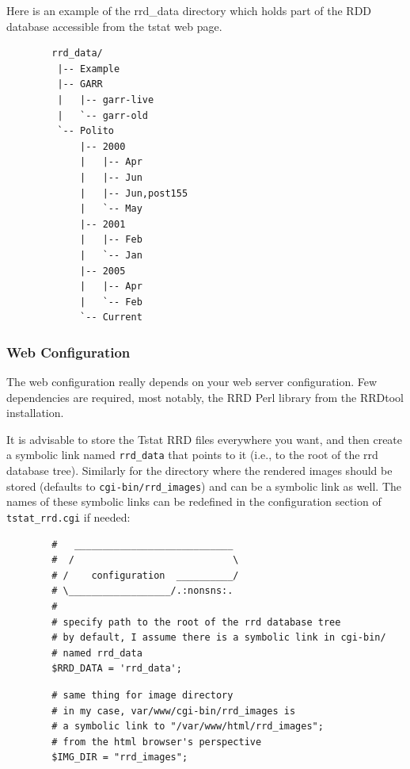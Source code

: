 \documentclass[11pt]{article}
\begin{document}
Here is an example of the rrd\_data directory which holds part of the RDD database
accessible from the tstat web page.

\begin{small}\begin{verbatim}
        rrd_data/
         |-- Example
         |-- GARR
         |   |-- garr-live
         |   `-- garr-old
         `-- Polito
             |-- 2000
             |   |-- Apr
             |   |-- Jun
             |   |-- Jun,post155
             |   `-- May
             |-- 2001
             |   |-- Feb
             |   `-- Jan
             |-- 2005
             |   |-- Apr
             |   `-- Feb
             `-- Current
\end{verbatim}\end{small} \noindent
\subsubsection{Web Configuration\label{Web_Configuration}}


The web configuration really depends on your web server configuration. Few
dependencies are required, most notably, the RRD Perl library from the RRDtool
installation.



It is advisable to store the Tstat RRD files
everywhere you want, and then create a symbolic link 
named \texttt{rrd\_data} that points to it (i.e., to the root of 
the rrd database tree). Similarly for the directory
where the rendered images should be stored (defaults to \texttt{cgi-bin/rrd\_images})
and can be a symbolic link as well.
The names of these symbolic links can be redefined in the 
configuration section of \texttt{tstat\_rrd.cgi} if needed:

\begin{small}\begin{verbatim}
        #   ____________________________
        #  /                            \
        # /    configuration  __________/
        # \__________________/.:nonsns:.
        #
        # specify path to the root of the rrd database tree
        # by default, I assume there is a symbolic link in cgi-bin/
        # named rrd_data
        $RRD_DATA = 'rrd_data';
\end{verbatim}\end{small} \noindent
\begin{small}\begin{verbatim}
        # same thing for image directory
        # in my case, var/www/cgi-bin/rrd_images is
        # a symbolic link to "/var/www/html/rrd_images";
        # from the html browser's perspective
        $IMG_DIR = "rrd_images";
\end{verbatim}\end{small} \noindent
\end{document}

